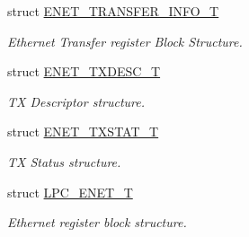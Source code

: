 \begin{DoxyCompactItemize}
struct \hyperlink{structENET__TRANSFER__INFO__T}{E\+N\+E\+T\+\_\+\+T\+R\+A\+N\+S\+F\+E\+R\+\_\+\+I\+N\+F\+O\+\_\+T}
\begin{DoxyCompactList}\small\item\em Ethernet Transfer register Block Structure. \end{DoxyCompactList}\item 
struct \hyperlink{structENET__TXDESC__T}{E\+N\+E\+T\+\_\+\+T\+X\+D\+E\+S\+C\+\_\+T}
\begin{DoxyCompactList}\small\item\em TX Descriptor structure. \end{DoxyCompactList}\item 
struct \hyperlink{structENET__TXSTAT__T}{E\+N\+E\+T\+\_\+\+T\+X\+S\+T\+A\+T\+\_\+T}
\begin{DoxyCompactList}\small\item\em TX Status structure. \end{DoxyCompactList}\item 
struct \hyperlink{structLPC__ENET__T}{L\+P\+C\+\_\+\+E\+N\+E\+T\+\_\+T}
\begin{DoxyCompactList}\small\item\em Ethernet register block structure. \end{DoxyCompactList}\end{DoxyCompactItemize}
